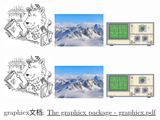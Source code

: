 \documentclass{ctexart}
\begin{document}
    \includegraphics[width=0.2\textwidth]{lion}
    \includegraphics[width=0.2\textwidth]{mountain}
    \includegraphics[width=0.2\textwidth]{oscilloscope}

    \includegraphics[angle=-45,width=0.2\textwidth]{lion}
    \includegraphics[width=0.2\textwidth]{mountain}
    \includegraphics[angle=45,width=0.2\textwidth]{oscilloscope}

    graphicx文档: \href{https://texdoc.net/texmf-dist/doc/latex/graphics/graphicx.pdf}{The graphicx package - graphicx.pdf}
\end{document}
